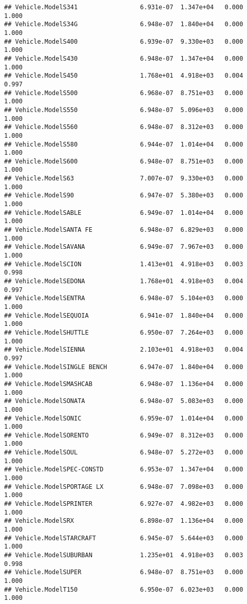 \documentclass[
]{article}
\begin{document}
\begin{verbatim}
## Vehicle.ModelS341                 6.931e-07  1.347e+04   0.000    1.000
## Vehicle.ModelS34G                 6.948e-07  1.840e+04   0.000    1.000
## Vehicle.ModelS400                 6.939e-07  9.330e+03   0.000    1.000
## Vehicle.ModelS430                 6.948e-07  1.347e+04   0.000    1.000
## Vehicle.ModelS450                 1.768e+01  4.918e+03   0.004    0.997
## Vehicle.ModelS500                 6.968e-07  8.751e+03   0.000    1.000
## Vehicle.ModelS550                 6.948e-07  5.096e+03   0.000    1.000
## Vehicle.ModelS560                 6.948e-07  8.312e+03   0.000    1.000
## Vehicle.ModelS580                 6.944e-07  1.014e+04   0.000    1.000
## Vehicle.ModelS600                 6.948e-07  8.751e+03   0.000    1.000
## Vehicle.ModelS63                  7.007e-07  9.330e+03   0.000    1.000
## Vehicle.ModelS90                  6.947e-07  5.380e+03   0.000    1.000
## Vehicle.ModelSABLE                6.949e-07  1.014e+04   0.000    1.000
## Vehicle.ModelSANTA FE             6.948e-07  6.829e+03   0.000    1.000
## Vehicle.ModelSAVANA               6.949e-07  7.967e+03   0.000    1.000
## Vehicle.ModelSCION                1.413e+01  4.918e+03   0.003    0.998
## Vehicle.ModelSEDONA               1.768e+01  4.918e+03   0.004    0.997
## Vehicle.ModelSENTRA               6.948e-07  5.104e+03   0.000    1.000
## Vehicle.ModelSEQUOIA              6.941e-07  1.840e+04   0.000    1.000
## Vehicle.ModelSHUTTLE              6.950e-07  7.264e+03   0.000    1.000
## Vehicle.ModelSIENNA               2.103e+01  4.918e+03   0.004    0.997
## Vehicle.ModelSINGLE BENCH         6.947e-07  1.840e+04   0.000    1.000
## Vehicle.ModelSMASHCAB             6.948e-07  1.136e+04   0.000    1.000
## Vehicle.ModelSONATA               6.948e-07  5.083e+03   0.000    1.000
## Vehicle.ModelSONIC                6.959e-07  1.014e+04   0.000    1.000
## Vehicle.ModelSORENTO              6.949e-07  8.312e+03   0.000    1.000
## Vehicle.ModelSOUL                 6.948e-07  5.272e+03   0.000    1.000
## Vehicle.ModelSPEC-CONSTD          6.953e-07  1.347e+04   0.000    1.000
## Vehicle.ModelSPORTAGE LX          6.948e-07  7.098e+03   0.000    1.000
## Vehicle.ModelSPRINTER             6.927e-07  4.982e+03   0.000    1.000
## Vehicle.ModelSRX                  6.898e-07  1.136e+04   0.000    1.000
## Vehicle.ModelSTARCRAFT            6.945e-07  5.644e+03   0.000    1.000
## Vehicle.ModelSUBURBAN             1.235e+01  4.918e+03   0.003    0.998
## Vehicle.ModelSUPER                6.948e-07  8.751e+03   0.000    1.000
## Vehicle.ModelT150                 6.950e-07  6.023e+03   0.000    1.000

\end{verbatim}
\end{document}
